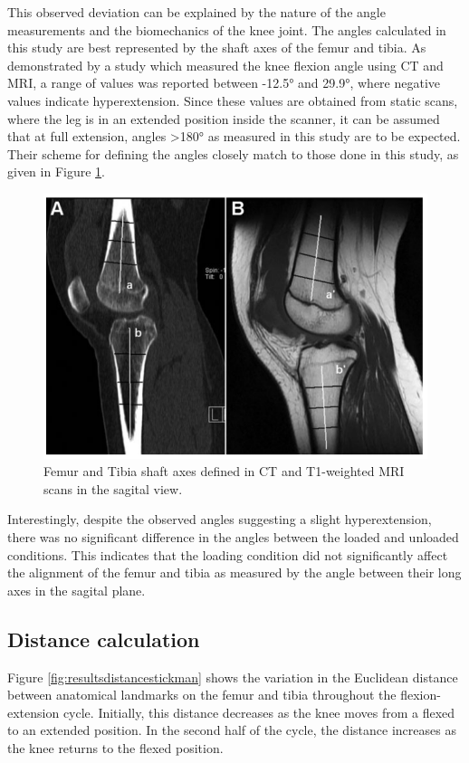 \documentclass{micro-econ-thesis}
\begin{document}
This observed deviation can be explained by the nature of the angle measurements and the biomechanics of the knee joint. The angles calculated in this study are best represented by the shaft axes of the femur and tibia. As demonstrated by a study \parencite{dai_comparing_2021} which measured the knee flexion angle using CT and MRI, a range of values was reported between -12.5° and 29.9°, where negative values indicate hyperextension. Since these values are obtained from static scans, where the leg is in an extended position inside the scanner, it can be assumed that at full extension, angles >180° as measured in this study are to be expected. Their scheme for defining the angles closely match to those done in this study, as given in Figure \ref{fig:daiimage}. 

\begin{figure}[H]
	\centering
	\includegraphics[width=0.7\linewidth]{dai_image}
	\caption{Femur and Tibia shaft axes defined in CT and T1-weighted MRI scans in the sagital view. \parencite{dai_comparing_2021}}
	\label{fig:daiimage}
\end{figure}

Interestingly, despite the observed angles suggesting a slight hyperextension, there was no significant difference in the angles between the loaded and unloaded conditions. This indicates that the loading condition did not significantly affect the alignment of the femur and tibia as measured by the angle between their long axes in the sagital plane. 

\subsection{Distance calculation}

Figure \ref{fig:resultsdistancestickman} shows the variation in the Euclidean distance between anatomical landmarks on the femur and tibia throughout the flexion-extension cycle. Initially, this distance decreases as the knee moves from a flexed to an extended position. In the second half of the cycle, the distance increases as the knee returns to the flexed position.
\end{document}
